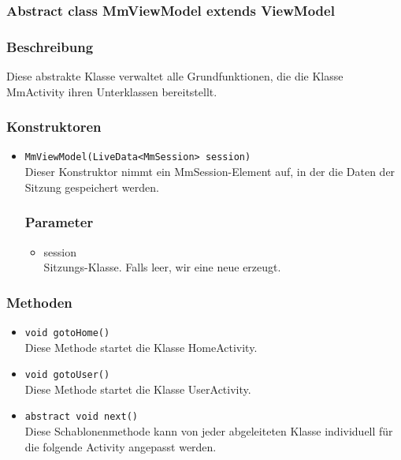 \documentclass[a4paper]{scrreprt}
\begin{document}
\subsubsection{Abstract class MmViewModel extends ViewModel}
\subsubsection*{Beschreibung}
Diese abstrakte Klasse verwaltet alle Grundfunktionen, die die Klasse MmActivity ihren Unterklassen bereitstellt.


\subsubsection*{Konstruktoren}
\begin{addmargin}[25pt]{0pt}
\begin{itemize}

\item \texttt{MmViewModel(LiveData<MmSession> session)}\\
	
	Dieser Konstruktor nimmt ein MmSession-Element auf, in der die Daten der Sitzung gespeichert werden.

	\subsubsection*{Parameter}
	\begin{itemize}
	\item session \\
		Sitzungs-Klasse. Falls leer, wir eine neue erzeugt.
	\end{itemize}

\end{itemize}
\end{addmargin}

\subsubsection*{Methoden}
\begin{addmargin}[25pt]{0pt}
\begin{itemize}


\item \texttt{void gotoHome()}\\
	Diese Methode startet die Klasse HomeActivity.

\item \texttt{void gotoUser()}\\
	Diese Methode startet die Klasse UserActivity.
	
\item \texttt{abstract void next()}\\
	Diese Schablonenmethode kann von jeder abgeleiteten Klasse individuell für die folgende Activity angepasst werden.
	
\end{itemize}
\end{addmargin}
\end{document}
